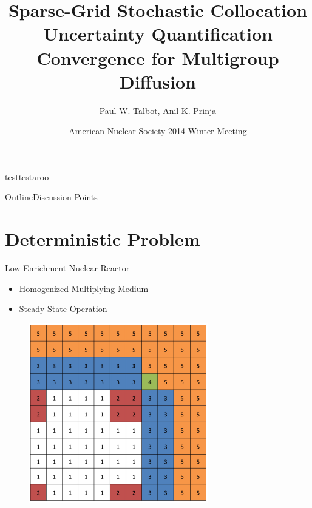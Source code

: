\documentclass{beamer}
\title[SC for Multigroup Neutron Diffusion] %
{Sparse-Grid Stochastic Collocation Uncertainty Quantification Convergence for Multigroup Diffusion}
\author[Talbot] %
{Paul W. Talbot\inst{1}, Anil K. Prinja\inst{1}}
\institute[University of New Mexico] %
{
  \inst{1}%
  University of New Mexico\\
   \vspace{10pt}
\footnotesize{Supported by Idaho National Laboratory}
}
\date[ANS Winter, 2014] %
{American Nuclear Society 2014 Winter Meeting}
\begin{document}
\begin{frame}
  \titlepage
\end{frame}

\begin{frame}{test}{testaroo}
\end{frame}

\begin{frame}{Outline}{Discussion Points}
  \tableofcontents[pausesections]
\end{frame}

\section{Deterministic Problem}
\begin{frame}{Low-Enrichment Nuclear Reactor}
\begin{itemize}
\item Homogenized Multiplying Medium
\item Steady State Operation
\end{itemize}
\begin{figure}
  \includegraphics[width=0.5\linewidth]{../graphics/core}
\end{figure}
\end{frame}
\end{document}
